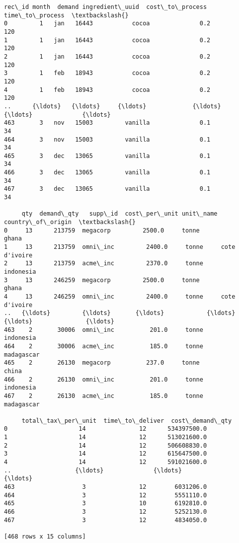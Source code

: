 \documentclass[11pt]{article}
\makeatletter
\newcommand{\boxspacing}{\kern\kvtcb@left@rule\kern\kvtcb@boxsep}
\newcommand{\prompt}[4]{
        {\ttfamily\llap{{\color{#2}[#3]:\hspace{3pt}#4}}\vspace{-\baselineskip}}
    }
\makeatother
\begin{document}
            \begin{tcolorbox}[breakable, size=fbox, boxrule=.5pt, pad at break*=1mm, opacityfill=0]
\prompt{Out}{outcolor}{10}{\boxspacing}
\begin{Verbatim}[commandchars=\\\{\}]
     rec\_id month  demand ingredient\_uuid  cost\_to\_process  time\_to\_process  \textbackslash{}
0         1   jan   16443           cocoa              0.2              120
1         1   jan   16443           cocoa              0.2              120
2         1   jan   16443           cocoa              0.2              120
3         1   feb   18943           cocoa              0.2              120
4         1   feb   18943           cocoa              0.2              120
..      {\ldots}   {\ldots}     {\ldots}             {\ldots}              {\ldots}              {\ldots}
463       3   nov   15003         vanilla              0.1               34
464       3   nov   15003         vanilla              0.1               34
465       3   dec   13065         vanilla              0.1               34
466       3   dec   13065         vanilla              0.1               34
467       3   dec   13065         vanilla              0.1               34

     qty  demand\_qty   supp\_id  cost\_per\_unit unit\_name country\_of\_origin  \textbackslash{}
0     13      213759  megacorp         2500.0     tonne             ghana
1     13      213759  omni\_inc         2400.0     tonne     cote d'ivoire
2     13      213759  acme\_inc         2370.0     tonne         indonesia
3     13      246259  megacorp         2500.0     tonne             ghana
4     13      246259  omni\_inc         2400.0     tonne     cote d'ivoire
..   {\ldots}         {\ldots}       {\ldots}            {\ldots}       {\ldots}               {\ldots}
463    2       30006  omni\_inc          201.0     tonne         indonesia
464    2       30006  acme\_inc          185.0     tonne        madagascar
465    2       26130  megacorp          237.0     tonne             china
466    2       26130  omni\_inc          201.0     tonne         indonesia
467    2       26130  acme\_inc          185.0     tonne        madagascar

     total\_tax\_per\_unit  time\_to\_deliver  cost\_demand\_qty
0                    14               12      534397500.0
1                    14               12      513021600.0
2                    14               12      506608830.0
3                    14               12      615647500.0
4                    14               12      591021600.0
..                  {\ldots}              {\ldots}              {\ldots}
463                   3               12        6031206.0
464                   3               12        5551110.0
465                   3               10        6192810.0
466                   3               12        5252130.0
467                   3               12        4834050.0

[468 rows x 15 columns]
\end{Verbatim}
\end{tcolorbox}
        
\end{document}
